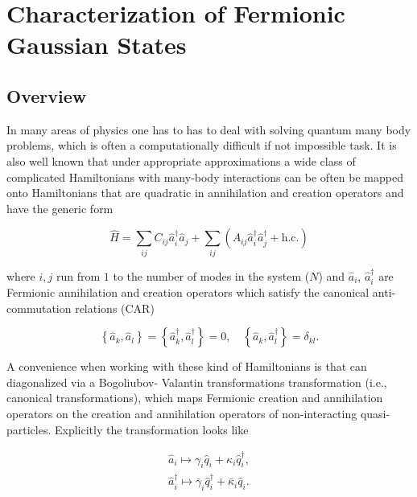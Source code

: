 \chapter{Characterization of Fermionic Gaussian States}

\section*{Overview}
In many areas of physics one has to has to deal with solving quantum many body problems, which is often a computationally difficult if not impossible task. It is also well known that under appropriate approximations a wide class of complicated Hamiltonians with many-body interactions can be often be mapped onto Hamiltonians that are quadratic in annihilation and creation operators and have the generic form \cite{botero_bcs-like_2004}

\begin{equation}
\hat{H}=\sum_{i j} C_{i j} \hat{a}_{i}^{\dagger} \hat{a}_{j}+\sum_{i j}\left(A_{i j} \hat{a}_{i}^{\dagger}\hat{a}_{j}^{\dagger}+\mathrm{h.c.}\right)
\label{CH2:QuadraticHamiltonian}
\end{equation}

where $i,j$ run from $1$ to the number of modes in the system ($N$) and $\hat{a}_i$, $\hat{a}^{\dagger}_i$ are Fermionic annihilation and creation operators which satisfy the canonical anti-commutation relations (CAR)\cite{fradkin_field_1997}

\begin{equation}
\left\{\hat{a}_{k}, \hat{a}_{l}\right\}=\left\{\hat{a}_{k}^{\dagger}, \hat{a}_{l}^{\dagger}\right\}=0, \quad\left\{\hat{a}_{k}, \hat{a}_{l}^{\dagger}\right\}=\delta_{k l}.
\label{CH2:Anticommutation}
\end{equation}

A convenience when working with these kind of Hamiltonians is that can diagonalized via a Bogoliubov- Valantin transformations transformation (i.e., canonical transformations), which maps Fermionic creation and annihilation operators on the creation and annihilation operators of non-interacting quasi-particles\cite{berezin_method_1966,bogoljubov_new_1958}. Explicitly the transformation looks like

\begin{equation}
\begin{array}{c}
\hat{a}_{i} \mapsto \gamma_{i} \hat{q}_{i}+\kappa_{i} \hat{q}_{i}^{\dagger}, \\
\hat{a}_{i}^{\dagger} \mapsto \bar{\gamma}_{i} \hat{q}_{i}^{\dagger}+\bar{\kappa}_{i} \hat{q}_{i}.
\end{array}
\label{CH2:Bogoliuvov}
\end{equation}

